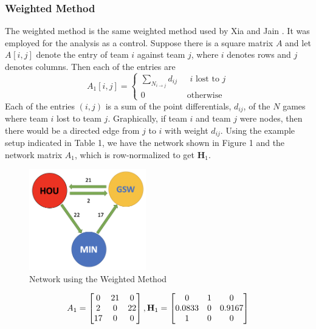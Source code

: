 \documentclass[12pt]{article}%
\begin{document}
\subsubsection{Weighted Method}
  \null\quad\quad The weighted method is the same weighted method used by Xia and Jain \cite{XJ}. It was employed for the analysis as a control. Suppose there is a square matrix $A$ and let $A_{}[i,j]$ denote the entry of team $i$ against team $j$, where $i$ denotes rows and $j$ denotes columns. Then each of the entries are
  \[
  A_{1}[i,j]=
  \begin{cases}
  \sum_{N_{i\rightarrow j}}d_{ij} &\text{ $i$ lost to $j$}\\
  0 &\text{ otherwise}
  \end{cases}
  \]
  Each of the entries $(i,j)$ is a sum of the point differentials, $d_{ij}$, of the $N$ games where team $i$ lost to team $j$. Graphically, if team $i$ and team $j$ were nodes, then there would be a directed edge from $j$ to $i$ with weight $d_{ij}$. Using the example setup indicated in Table 1, we have the network shown in Figure 1 and the network matrix $A_1$, which is row-normalized to get $\textbf{H}_1$.
  \begin{figure}[H]
	\centering
	\includegraphics[width=2in]{./images/weighted.png}
	\caption[Network using the Weighted Method]{Network using the Weighted Method}
\end{figure}
\begin{align*}
A_1 =\begin{bmatrix}0 & 21 & 0\\2 & 0 & 22\\17 & 0 & 0\end{bmatrix}, \textbf H_1=\begin{bmatrix}0 & 1 & 0\\0.0833 & 0 & 0.9167\\1 & 0 & 0\end{bmatrix}
\end{align*}
\end{document}
